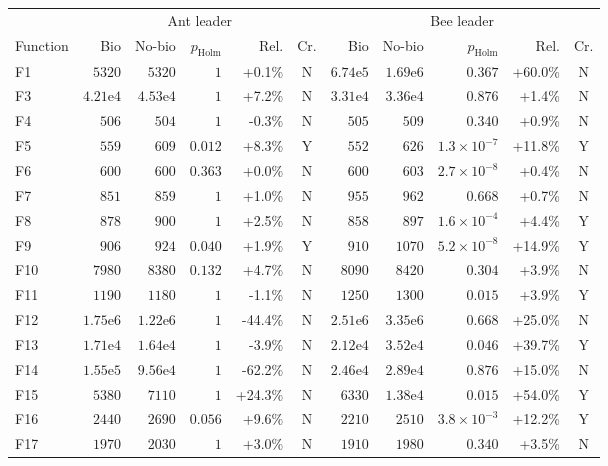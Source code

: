 \begin{tabular}{lrrrrcrrrrc}
\toprule
 & \multicolumn{5}{c}{Ant leader} & \multicolumn{5}{c}{Bee leader} \\
Function & Bio & No-bio & $p_{\mathrm{Holm}}$ & Rel. & Cr. & Bio & No-bio & $p_{\mathrm{Holm}}$ & Rel. & Cr. \\
\midrule
F1 & $5320$ & $5320$ & $1$ & +0.1\% & N & $6.74\mathrm{e}{5}$ & $1.69\mathrm{e}{6}$ & $0.367$ & +60.0\% & N \\
F3 & $4.21\mathrm{e}{4}$ & $4.53\mathrm{e}{4}$ & $1$ & +7.2\% & N & $3.31\mathrm{e}{4}$ & $3.36\mathrm{e}{4}$ & $0.876$ & +1.4\% & N \\
F4 & $506$ & $504$ & $1$ & -0.3\% & N & $505$ & $509$ & $0.340$ & +0.9\% & N \\
F5 & $559$ & $609$ & $0.012$ & +8.3\% & Y & $552$ & $626$ & $1.3\times10^{-7}$ & +11.8\% & Y \\
F6 & $600$ & $600$ & $0.363$ & +0.0\% & N & $600$ & $603$ & $2.7\times10^{-8}$ & +0.4\% & N \\
F7 & $851$ & $859$ & $1$ & +1.0\% & N & $955$ & $962$ & $0.668$ & +0.7\% & N \\
F8 & $878$ & $900$ & $1$ & +2.5\% & N & $858$ & $897$ & $1.6\times10^{-4}$ & +4.4\% & Y \\
F9 & $906$ & $924$ & $0.040$ & +1.9\% & Y & $910$ & $1070$ & $5.2\times10^{-8}$ & +14.9\% & Y \\
F10 & $7980$ & $8380$ & $0.132$ & +4.7\% & N & $8090$ & $8420$ & $0.304$ & +3.9\% & N \\
F11 & $1190$ & $1180$ & $1$ & -1.1\% & N & $1250$ & $1300$ & $0.015$ & +3.9\% & Y \\
F12 & $1.75\mathrm{e}{6}$ & $1.22\mathrm{e}{6}$ & $1$ & -44.4\% & N & $2.51\mathrm{e}{6}$ & $3.35\mathrm{e}{6}$ & $0.668$ & +25.0\% & N \\
F13 & $1.71\mathrm{e}{4}$ & $1.64\mathrm{e}{4}$ & $1$ & -3.9\% & N & $2.12\mathrm{e}{4}$ & $3.52\mathrm{e}{4}$ & $0.046$ & +39.7\% & Y \\
F14 & $1.55\mathrm{e}{5}$ & $9.56\mathrm{e}{4}$ & $1$ & -62.2\% & N & $2.46\mathrm{e}{4}$ & $2.89\mathrm{e}{4}$ & $0.876$ & +15.0\% & N \\
F15 & $5380$ & $7110$ & $1$ & +24.3\% & N & $6330$ & $1.38\mathrm{e}{4}$ & $0.015$ & +54.0\% & Y \\
F16 & $2440$ & $2690$ & $0.056$ & +9.6\% & N & $2210$ & $2510$ & $3.8\times10^{-3}$ & +12.2\% & Y \\
F17 & $1970$ & $2030$ & $1$ & +3.0\% & N & $1910$ & $1980$ & $0.340$ & +3.5\% & N \\

\end{tabular}
